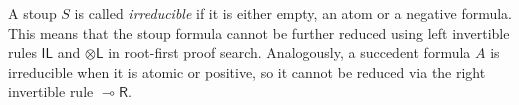 \documentclass[runningheads]{llncs}
\newcommand{\tl}{\otimes \mathsf{L}}
\newcommand{\tr}{\otimes \mathsf{R}}
\newcommand{\lright}{{\multimap}\mathsf{R}}
\newcommand{\lleft}{{\multimap}\mathsf{L}}
\newcommand{\pass}{\mathsf{pass}}
\newcommand{\unitl}{\mathsf{IL}}
\newcommand{\otL}{\tl}
\newcommand{\lolliR}{\lright}
\newcommand{\IL}{\unitl}
\newcommand{\ot}{\otimes}
\newcommand{\lolli}{\multimap}
\newcommand{\illol}{\rotatebox[origin=c]{180}{$\multimap$}}
\newcommand{\I}{\mathsf{I}}
\newcommand{\NMILL}{\texttt{NMILL}}
\newcommand{\SkNMILL}{\texttt{SkNMILL}}
\begin{document}
A stoup $S$ is called \emph{irreducible} if it is either empty, an atom or a negative formula. This means that the stoup formula cannot be further reduced using left invertible rules $\IL$ and $\otL$ in root-first proof search. Analogously, a succedent formula $A$ is irreducible when it is atomic or positive, so it cannot be reduced via the right invertible rule $\lolliR$.


\end{document}
